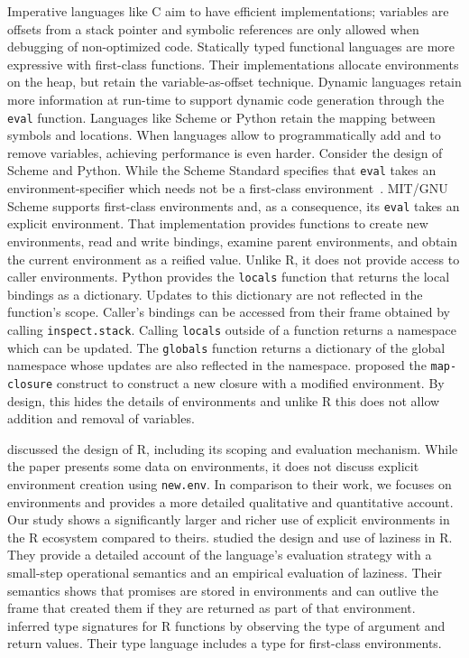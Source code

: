 \documentclass[10pt,review,sigplan,authorversion=true]{acmart}
\renewcommand{\c}[1]{\lstinline |#1|\xspace}
\begin{document}
Imperative languages like C aim to have efficient implementations; variables are
offsets from a stack pointer and symbolic references are only allowed when
debugging of non-optimized code. Statically typed functional languages are more
expressive with first-class functions. Their implementations allocate
environments on the heap, but retain the variable-as-offset technique. Dynamic
languages retain more information at run-time to support dynamic code generation
through the \c{eval} function. Languages like Scheme or Python retain the
mapping between symbols and locations. When languages allow to programmatically
add and to remove variables, achieving performance is even harder. Consider the
design of Scheme and Python. While the Scheme Standard specifies that
\c{eval} takes an environment-specifier which needs not be a first-class
environment~\cite{SchemeR5RS}. MIT/GNU Scheme supports first-class environments
and, as a consequence, its \c{eval} takes an explicit environment. That
implementation provides functions to create new environments, read and write
bindings, examine parent environments, and obtain the current environment as a
reified value. Unlike R, it does not provide access to caller environments.
Python provides the \c{locals} function that returns the local bindings as a
dictionary. Updates to this dictionary are not reflected in the function's
scope. Caller's bindings can be accessed from their frame obtained by calling
\c{inspect.stack}. Calling \c{locals} outside of a function returns a
namespace which can be updated. The \c{globals} function returns a dictionary
of the global namespace whose updates are also reflected in the namespace.
\citet{Siskind07} proposed the \c{map-closure} construct to construct a new
closure with a modified environment. By design, this hides the details of
environments and unlike R this does not allow addition and removal of variables.

\citet{ecoop12} discussed the design of R, including its scoping and evaluation
mechanism. While the paper presents some data on environments, it does not
discuss explicit environment creation using \c{new.env}. In comparison to
their work, we focuses on environments and provides a more detailed qualitative
and quantitative account. Our study shows a significantly larger and richer use
of explicit environments in the R ecosystem compared to theirs.
\citet{oopsla19b} studied the design and use of laziness in R. They provide a
detailed account of the language’s evaluation strategy with a small-step
operational semantics and an empirical evaluation of laziness. Their semantics
shows that promises are stored in environments and can outlive the frame that
created them if they are returned as part of that environment. \citet{oopsla20b}
inferred type signatures for R functions by observing the type of argument and
return values. Their type language includes a type for first-class environments.
\end{document}
